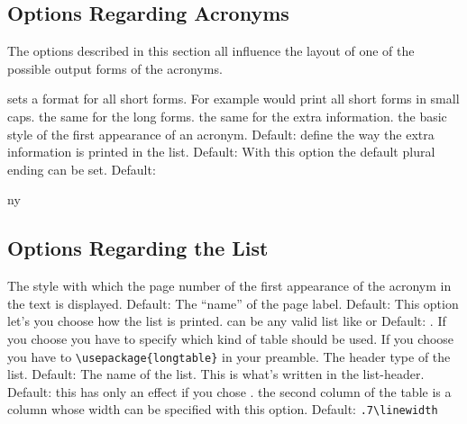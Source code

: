 \documentclass[DIV10,toc=index,toc=bib]{cnpkgdoc}
\begin{document}
\subsection{Options Regarding Acronyms}
The options described in this section all influence the layout of one of the
possible output forms of the acronyms.
\begin{beschreibung}
  sets a format for all short forms. For example
  would print all short forms in small caps.
  the same for the long forms.
  the same for the extra information.
  the basic style of the first
 appearance of an acronym. Default: 
  define the way the extra
 information is printed in the list. Default: 
  With this option the default plural ending
 can be set. Default: 
\end{beschreibung}

\begin{beispiel}
 \acf{ny}
\end{beispiel}

\subsection{Options Regarding the List}
\begin{beschreibung}
  The style with which the page number of
 the first appearance of the acronym in the text is displayed. Default: 
  The ``name'' of the page label. Default: 
  This option let's you choose how the list is
 printed.  can be any valid list like  or 
 Default: .
  If you choose 
 you have to specify which kind of table should be used. If you choose 
 you have to \verb+\usepackage{longtable}+ in your preamble.
 The header type of the list. Default: 
  The name of the list. This is what's written in
 the list-header. Default: 
  this has only an effect if you chose .
 the second column of the table is a  column whose width can be specified
 with this option. Default: \verb+.7\linewidth+
\end{beschreibung}
\end{document}
